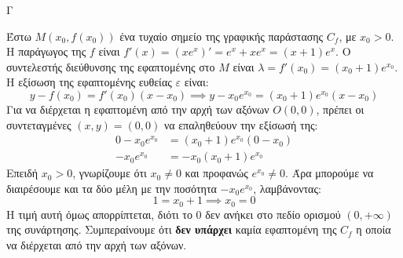 \begin{thema}{Γ}
\begin{erwthma}
\item Έστω $M(x_0, f(x_0))$ ένα τυχαίο σημείο της γραφικής παράστασης $C_f$, με $x_0 > 0$.
Η παράγωγος της $f$ είναι $f'(x) = (x e^x)' = e^x + x e^x = (x+1)e^x$.
Ο συντελεστής διεύθυνσης της εφαπτομένης στο $M$ είναι $\lambda = f'(x_0) = (x_0+1)e^{x_0}$.
Η εξίσωση της εφαπτομένης ευθείας $\varepsilon$ είναι:
\[ y - f(x_0) = f'(x_0)(x - x_0) \implies y - x_0 e^{x_0} = (x_0 + 1)e^{x_0}(x - x_0) \]
Για να διέρχεται η εφαπτομένη από την αρχή των αξόνων $O(0,0)$, πρέπει οι συντεταγμένες $(x,y)=(0,0)$ να επαληθεύουν την εξίσωσή της:
\begin{align*}
0 - x_0 e^{x_0} &= (x_0 + 1)e^{x_0}(0 - x_0) \\
-x_0 e^{x_0} &= -x_0(x_0 + 1)e^{x_0}
\end{align*}
Επειδή $x_0 > 0$, γνωρίζουμε ότι $x_0 \neq 0$ και προφανώς $e^{x_0} \neq 0$. 
Άρα μπορούμε να διαιρέσουμε και τα δύο μέλη με την ποσότητα $-x_0 e^{x_0}$, λαμβάνοντας:
\[ 1 = x_0 + 1 \implies x_0 = 0 \]
Η τιμή αυτή όμως απορρίπτεται, διότι το $0$ δεν ανήκει στο πεδίο ορισμού $(0, +\infty)$ της συνάρτησης.
Συμπεραίνουμε ότι \textbf{δεν υπάρχει} καμία εφαπτομένη της $C_f$ η οποία να διέρχεται από την αρχή των αξόνων.
\end{erwthma}
\end{thema}

